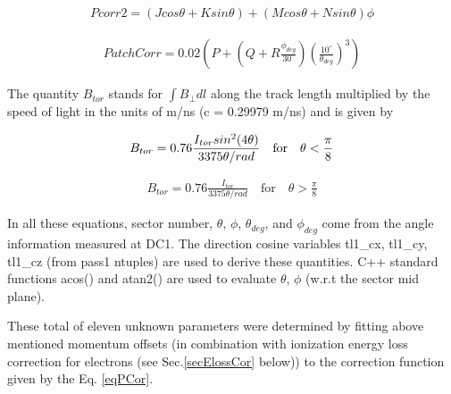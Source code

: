 \begin{eqnarray}
\label{eqPCor2}
Pcorr2 = (J cos\theta + K sin\theta) + (M cos\theta+N sin\theta)\phi
\end{eqnarray}

\begin{eqnarray}
\label{eqPatchCor}
PatchCorr = 0.02\left(P + (Q + R\frac{\phi_{deg}}{30^\circ})(\frac{10^\circ}{\theta_{deg}})^3 \right) 
\end{eqnarray}

The quantity $B_{tor}$ stands for $\int{B_{\perp}dl}$ along the track length multiplied by the speed of light in the units 
of m/ns (c = 0.29979 m/ns) and is given by

\begin{eqnarray}
\label{eqBtor1}
B_{tor} = 0.76 \frac{I_{tor}sin^2(4\theta)}{3375\theta/rad} \quad  \rm{for} \quad  \theta < \frac{\pi}{8} %
\end{eqnarray}

\begin{eqnarray}
\label{eqBtor2}
B_{tor} = 0.76 \frac{I_{tor}}{3375\theta/rad}  \quad  \textrm{for}  \quad  \theta > \frac{\pi}{8}
\end{eqnarray}

In all these equations, sector number, $\theta$, $\phi$, $\theta_{deg}$, and $\phi_{deg}$ come from the angle information measured at DC1. The direction cosine variables tl1\_cx, tl1\_cy, tl1\_cz (from pass1 ntuples) are used to derive these quantities. C++ standard functions acos() and atan2() are used to evaluate $\theta$, $\phi$ (w.r.t the sector mid plane). %



These total of eleven unknown parameters were determined by fitting above mentioned momentum offsets (in combination with ionization energy loss correction for electrons (see Sec.\ref{secElossCor} below)) to the correction function given by the Eq. \ref{eqPCor}.




